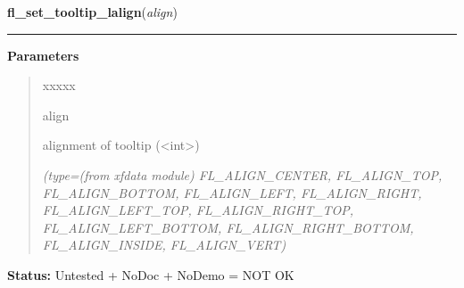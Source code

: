    \label{xformslib:flgoodies:fl_set_tooltip_lalign}

    \vspace{0.5ex}

\hspace{.8\funcindent}\begin{boxedminipage}{\funcwidth}

    \raggedright \textbf{fl\_set\_tooltip\_lalign}(\textit{align})

    \vspace{-1.5ex}

    \rule{\textwidth}{0.5\fboxrule}
\setlength{\parskip}{2ex}
\setlength{\parskip}{1ex}
      \textbf{Parameters}
      \vspace{-1ex}

      \begin{quote}
        \begin{Ventry}{xxxxx}

          \item[align]

          alignment of tooltip ({\textless}int{\textgreater})

            {\it (type=(from xfdata module) FL\_ALIGN\_CENTER, FL\_ALIGN\_TOP, FL\_ALIGN\_BOTTOM, 
FL\_ALIGN\_LEFT, FL\_ALIGN\_RIGHT, FL\_ALIGN\_LEFT\_TOP, 
FL\_ALIGN\_RIGHT\_TOP, FL\_ALIGN\_LEFT\_BOTTOM, FL\_ALIGN\_RIGHT\_BOTTOM, 
FL\_ALIGN\_INSIDE, FL\_ALIGN\_VERT)}

        \end{Ventry}

      \end{quote}

\textbf{Status:} Untested + NoDoc + NoDemo = NOT OK



    \end{boxedminipage}

    \label{xformslib:flgoodies:fl_exe_command}

    \vspace{0.5ex}

